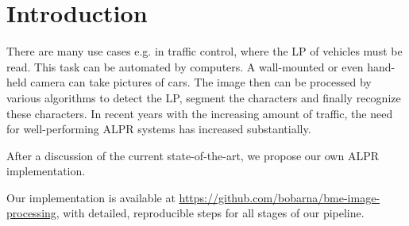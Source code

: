 \section{Introduction}

There are many use cases e.g. in traffic control, where the \ac{LP} of vehicles
must be read.  This task can be automated by computers. A wall-mounted or even
hand-held camera can take pictures of cars. The image then can be processed by
various algorithms to detect the \ac{LP}, segment the characters and finally
recognize these characters.  In recent years with the increasing amount of
traffic, the need for well-performing \ac{ALPR} systems has increased
substantially.

After a discussion of the current state-of-the-art, we propose our own \ac{ALPR}
implementation. 

Our implementation is available at
\url{https://github.com/bobarna/bme-image-processing}, with detailed,
reproducible steps for all stages of our pipeline.
